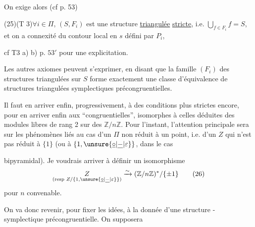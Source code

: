 On exige alors (cf p. 53)

(25)\qquad (T 3)\qquad $\forall i\in\Pi$, $(S,F_i)$ est une structure \uline{triangulée} \uline{stricte}, i.e. $\bigcup_{f\in F_i}f=S$, et on a connexité du contour local en $s$ défini par $P_i$,

cf T3 a) b) p. $53'$ pour une explicitation.

Les autres axiomes peuvent s'exprimer, en disant que la famille $(F_i)$ des structures triangulées sur $S$ forme exactement une classe d'équivalence de structures triangulées symplectiques précongruentielles.


Il faut en arriver enfin, progressivement, à des conditions plus strictes encore, pour en arriver enfin aux   ``congruentielles'', isomorphes à celles déduites des modules libres de rang 2 sur des $\mathbb Z/n\mathbb Z$. Pour l'instant, l'attention principale  sera sur les phénomènes liés au cas d'un $\Pi$ non réduit à un point, i.e. d'un $Z$ qui n'est pas réduit à $\{1\}$ (ou à $\{1,\unsure{\underline{\circ}|\underline{-}|\varepsilon}\}$, dans le cas


bipyramidal). Je voudrais  arriver à définir un isomorphisme
\[
\underset{(\text{resp }Z/\{1,\unsure{\underline{\circ}|\underline{-}|\varepsilon}\})}{Z}\xrightarrow{\sim}(\mathbb Z/n\mathbb Z)^{*}/\{\pm1\}\tag*{(26)}
\]
pour $n$ convenable.

On va donc revenir, pour fixer les idées, à la donnée d'une structure -symplectique précongruentielle. On supposera

